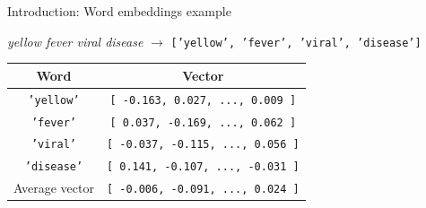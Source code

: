 \begin{frame}[t]{Introduction: Word embeddings example}


\vspace*{2mm}

\begingroup\large
\textit{yellow fever viral disease} $\rightarrow$ \texttt{['yellow', 'fever', 'viral', 'disease']}
\endgroup

\vspace*{6mm}

\begin{center}
\renewcommand*{\arraystretch}{1.2}
\begin{tabular}{cc}
Word & Vector\\
\midrule
\texttt{'yellow'}  & \texttt{\small [ -0.163,  \phantom{-}0.027, ..., \phantom{-}0.009 ]}\\
\texttt{'fever'}   & \texttt{\small [ \phantom{-}0.037,  -0.169, ..., \phantom{-}0.062 ]}\\
\texttt{'viral'}   & \texttt{\small [ -0.037,  -0.115, ..., \phantom{-}0.056 ]}\\
\texttt{'disease'} & \texttt{\small [ \phantom{-}0.141,  -0.107, ..., -0.031 ]}\\
\midrule
Average vector & \texttt{\small [ -0.006,  -0.091, ..., \phantom{-}0.024 ]}\\
\end{tabular}
\end{center}

\end{frame}

